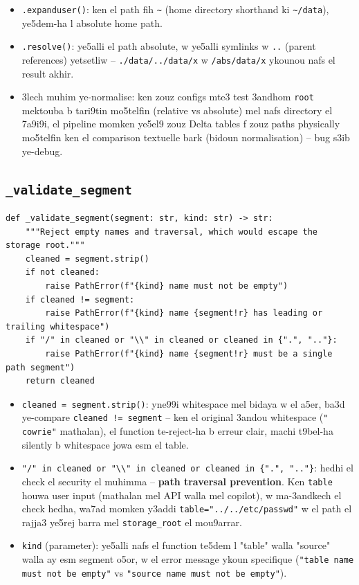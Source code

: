 \documentclass[11pt,a4paper]{report}
\DeclareRobustCommand{\code}[1]{\texttt{#1}}
\begin{document}
\begin{itemize}
  \item \code{.expanduser()}: ken el path fih \code{\~{}} (home directory
        shorthand ki \code{\~{}/data}), ye5dem-ha l absolute home path.
  \item \code{.resolve()}: ye5alli el path absolute, w ye5alli symlinks w
        \code{..} (parent references) yetsetliw -- \code{./data/../data/x}
        w \code{/abs/data/x} ykounou nafs el result akhir.
  \item 3lech muhim ye-normalise: ken zouz configs mte3 test 3andhom \code{root}
        mektouba b tari9tin mo5telfin (relative vs absolute) mel nafs directory
        el 7a9i9i, el pipeline momken ye5el9 zouz Delta tables f zouz paths
        physically mo5telfin ken el comparison textuelle bark (bidoun
        normalisation) -- bug s3ib ye-debug.
\end{itemize}

\subsection{\code{\_validate\_segment}}

\begin{lstlisting}[style=pystyle]
def _validate_segment(segment: str, kind: str) -> str:
    """Reject empty names and traversal, which would escape the storage root."""
    cleaned = segment.strip()
    if not cleaned:
        raise PathError(f"{kind} name must not be empty")
    if cleaned != segment:
        raise PathError(f"{kind} name {segment!r} has leading or trailing whitespace")
    if "/" in cleaned or "\\" in cleaned or cleaned in {".", ".."}:
        raise PathError(f"{kind} name {segment!r} must be a single path segment")
    return cleaned
\end{lstlisting}

\begin{itemize}
  \item \code{cleaned = segment.strip()}: yne99i whitespace mel bidaya w
        el a5er, ba3d ye-compare \code{cleaned != segment} -- ken el original
        3andou whitespace (\code{" cowrie"} mathalan), el function te-reject-ha
        b erreur clair, machi t9bel-ha silently b whitespace jowa esm el table.
  \item \code{"/" in cleaned or "\textbackslash{}\textbackslash{}" in cleaned or cleaned in \{".", ".."\}}:
        hedhi el check el security el muhimma -- \textbf{path traversal
        prevention}. Ken \code{table} houwa user input (mathalan mel API
        walla mel copilot), w ma-3andkech el check hedha, wa7ad momken y3addi
        \code{table="../../etc/passwd"} w el path el rajja3 ye5rej barra mel
        \code{storage\_root} el mou9arrar.
  \item \code{kind} (parameter): ye5alli nafs el function te5dem l "table"
        walla "source" walla ay esm segment o5or, w el error message ykoun
        specifique (\code{"table name must not be empty"} vs \code{"source
        name must not be empty"}).
\end{itemize}
\end{document}
